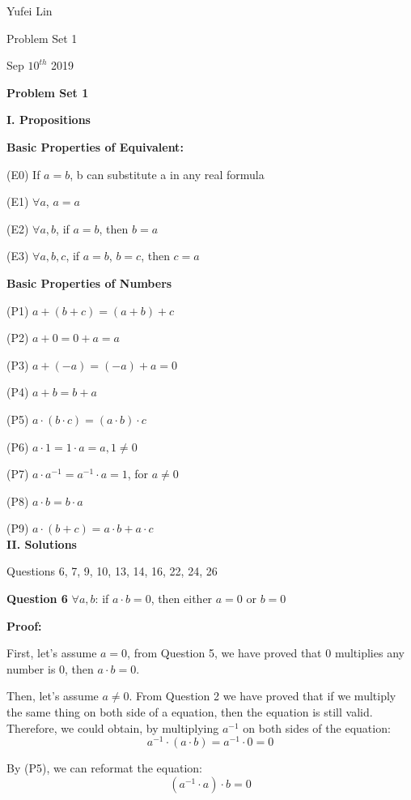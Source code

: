 \documentclass[a4paper,12pt]{report}
\begin{document}
\noindent
Yufei Lin

\noindent
Problem Set 1

\noindent
Sep \(10^{th}\) 2019

\begin{center}
\textbf{Problem Set 1}
\end{center}

\noindent
\textbf{I. Propositions}

\noindent
\textbf{Basic Properties of Equivalent:}

(E0) If $a=b$, b can substitute a in any real formula

(E1) $\forall a$, $a=a$

(E2) $\forall a,b$, if $a = b$, then $b =a$

(E3) $\forall a,b,c$, if $a=b$, $b=c$, then $c=a$

\noindent
\textbf{Basic Properties of Numbers}

(P1) $a+(b+c)=(a+b)+c$

(P2) $a+0=0+a=a$

(P3) $a+(-a)=(-a)+a=0$

(P4) $a+b=b+a$

(P5) $a \cdot{(b \cdot{c})}=(a \cdot{b}) \cdot{c}$

(P6) $a \cdot{1}=1\cdot{a}=a, 1\neq0$

(P7) $a\cdot{a^{-1}}=a^{-1}\cdot{a}=1$, for $a \neq 0$

(P8) $a\cdot{b} = b\cdot{a}$

(P9) $a \cdot{(b+c)} = a\cdot{b} +a\cdot{c}$
\\

\noindent
\textbf{II. Solutions}

\noindent
Questions 6, 7, 9, 10, 13, 14, 16, 22, 24, 26

\noindent
\textbf{Question 6} $\forall a,b$: if $a \cdot{b} = 0$, then either $a=0$ or $b=0$

\noindent
\textbf{Proof:}

\noindent
First, let's assume $a=0$, from Question 5, we have proved that 0 multiplies any number is 0, then $a\cdot{b}=0$.

\noindent
Then, let's assume $a\neq 0$. From Question 2 we have proved that if we multiply the same thing on both side of a equation, then the equation is still valid. Therefore, we could obtain, by multiplying $a^{-1}$ on both sides of the equation:\[a^{-1}\cdot{(a\cdot{b})} = a^{-1}\cdot{0} = 0\]

\noindent
By (P5), we can reformat the equation:\[(a^{-1}\cdot{a})\cdot{b} =0\]
\end{document}
